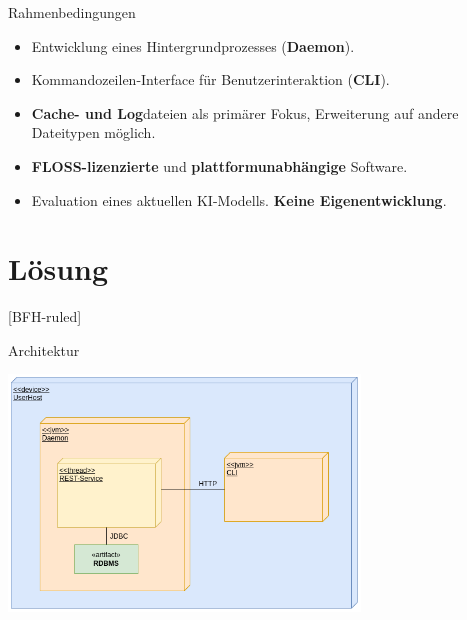 \documentclass[
    ngerman,%
    authorontitle=true,
]{bfhbeamer}
\begin{document}
    \begin{frame}{Rahmenbedingungen}
        \begin{itemize}
            \item Entwicklung eines Hintergrundprozesses (\textbf{Daemon}).
            \item Kommandozeilen-Interface f\"ur Benutzerinteraktion (\textbf{CLI}).
            \item \textbf{Cache- und Log}dateien als prim\"arer Fokus, Erweiterung auf andere Dateitypen m\"oglich.
            \item \textbf{FLOSS-lizenzierte} und \textbf{plattformunabh\"angige} Software.
            \item Evaluation eines aktuellen KI-Modells. \textbf{Keine Eigenentwicklung}.
        \end{itemize}
    \end{frame}


    \section{Lösung}\label{sec:loesung}
    [BFH-ruled]
    \frame{\sectionpage}

    \begin{frame}{Architektur}
        \begin{center}
            \includegraphics[width=0.7\textwidth]{assets/DeplDiagram}
        \end{center}
    \end{frame}
\end{document}
